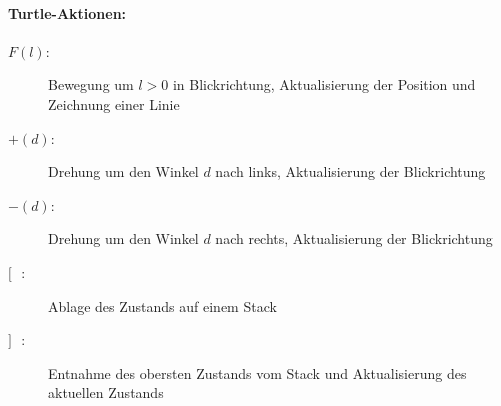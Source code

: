 \newpage
{}

\paragraph{Turtle-Aktionen: \\}

\begin{description}
	\item[\boldmath$F(l):$] Bewegung um $l>0$ in Blickrichtung, Aktualisierung der Position und Zeichnung einer Linie\\
	
	\item[\boldmath$+(d):$]  Drehung um den Winkel $d$ nach links, Aktualisierung der Blickrichtung\\
	
	\item[\boldmath$-(d):$] Drehung um den Winkel $d$ nach rechts, Aktualisierung der Blickrichtung\\
	
	\item[\boldmath$[ \text{ }:$] Ablage des Zustands auf einem Stack\\
	
	\item[\boldmath$\mathbf{]} \text{ }:$] Entnahme des obersten Zustands vom Stack und Aktualisierung des aktuellen Zustands
	
\end{description}




